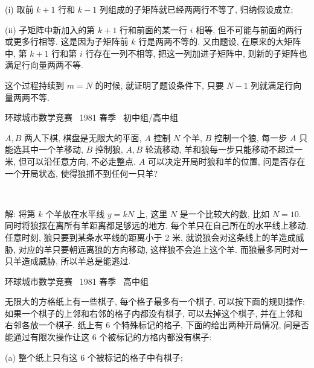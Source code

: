 (i) 取前 $ k + 1 $ 行和 $ k - 1 $ 列组成的子矩阵就已经两两行不等了, 归纳假设成立;

(ii) 子矩阵中新加入的第 $ k+1 $ 行和前面的某一行 $ i $ 相等, 但不可能与前面的两行或更多行相等. 这是因为子矩阵前 $ k $ 行是两两不等的. 又由题设, 在原来的大矩阵中, 第 $ k + 1 $ 行和第 $ i $ 行存在一列不相等, 把这一列加进子矩阵中, 则新的子矩阵也满足行向量两两不等.

这个过程持续到 $ m = N $ 的时候, 就证明了题设条件下, 只要 $ N - 1 $ 列就满足行向量两两不等.


\newpage

\noindent 环球城市数学竞赛~ 1981 春季~ 初中组/高中组

$ A, B $ 两人下棋, 棋盘是无限大的平面, $ A $ 控制 $ N $ 个羊, $ B $ 控制一个狼, 每一步 $ A $ 只能选其中一个羊移动, $B$ 控制狼, $A,B$ 轮流移动, 羊和狼每一步只能移动不超过一米, 但可以沿任意方向, 不必走整点. $ A $ 可以决定开局时狼和羊的位置, 问是否存在一个开局状态, 使得狼抓不到任何一只羊?

~

解: 将第 $ k $ 个羊放在水平线 $ y = kN $ 上, 这里 $ N $ 是一个比较大的数, 比如 $ N = 10 $. 同时将狼摆在离所有羊距离都足够远的地方. 每个羊只在自己所在的水平线上移动. 任意时刻, 狼只要到某条水平线的距离小于 2 米, 就说狼会对这条线上的羊造成威胁, 对应的羊只要朝远离狼的方向移动, 这样狼不会追上这个羊. 而狼最多同时对一只羊造成威胁, 所以羊总是能逃过.

\newpage
\noindent 环球城市数学竞赛~ 1981 春季~ 高中组

\begin{figure*}[htbp]
\centering
{}
\end{figure*}

无限大的方格纸上有一些棋子, 每个格子最多有一个棋子, 可以按下面的规则操作: 如果一个棋子的上邻和右邻的格子内都没有棋子, 可以去掉这个棋子, 并在上邻和右邻各放一个棋子. 纸上有 6 个特殊标记的格子, 下面的给出两种开局情况, 问是否能通过有限次操作让这 6 个被标记的方格内都没有棋子:

(a) 整个纸上只有这 6 个被标记的格子中有棋子;

